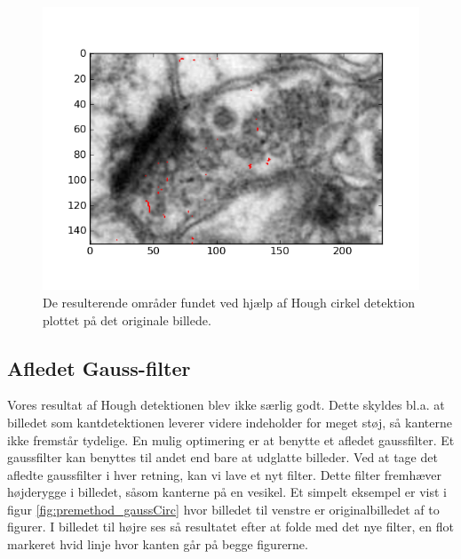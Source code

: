 \begin{figure}[H]
	\centering
	\includegraphics[scale=0.8]{files/premethod/img/houghres.png}
	\caption{De resulterende områder fundet ved hjælp af Hough cirkel detektion plottet på det originale billede.\label{fig:premethod_houghCellLinesThresholdOnOrig}}
\end{figure}


\subsection{Afledet Gauss-filter}
Vores resultat af Hough detektionen blev ikke særlig godt. Dette skyldes bl.a. at billedet som kantdetektionen leverer videre indeholder for meget støj, så kanterne ikke fremstår tydelige. En mulig optimering er at benytte et afledet gaussfilter. Et gaussfilter kan benyttes til andet end bare at udglatte billeder. Ved at tage det afledte gaussfilter i hver retning, kan vi lave et nyt filter. Dette filter fremhæver højderygge i billedet, såsom kanterne på en vesikel. Et simpelt eksempel er vist i figur \ref{fig:premethod_gaussCirc} hvor billedet til venstre er originalbilledet af to figurer. I billedet til højre ses så resultatet efter at folde med det nye filter, en flot markeret hvid linje hvor kanten går på begge figurerne.

